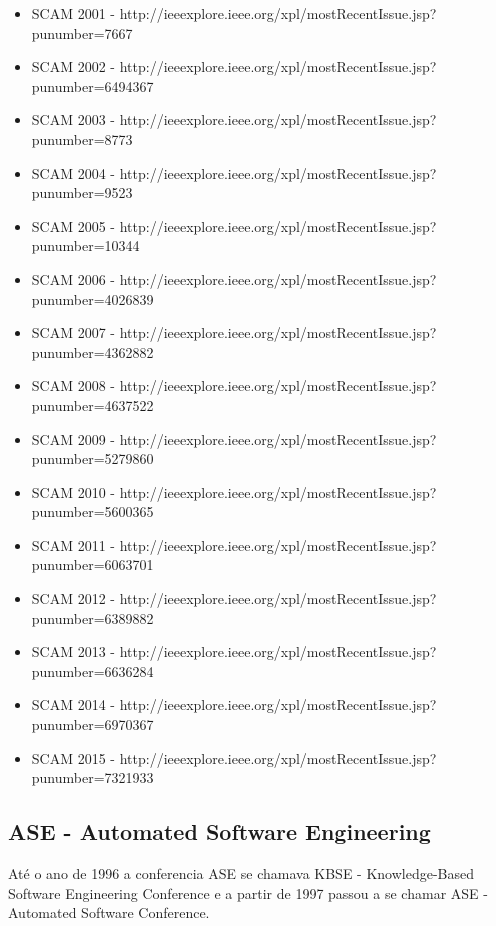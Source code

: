 \begin{itemize}
  \item SCAM 2001 - {\small http://ieeexplore.ieee.org/xpl/mostRecentIssue.jsp?punumber=7667}
  \item SCAM 2002 - {\small http://ieeexplore.ieee.org/xpl/mostRecentIssue.jsp?punumber=6494367}
  \item SCAM 2003 - {\small http://ieeexplore.ieee.org/xpl/mostRecentIssue.jsp?punumber=8773}
  \item SCAM 2004 - {\small http://ieeexplore.ieee.org/xpl/mostRecentIssue.jsp?punumber=9523}
  \item SCAM 2005 - {\small http://ieeexplore.ieee.org/xpl/mostRecentIssue.jsp?punumber=10344}
  \item SCAM 2006 - {\small http://ieeexplore.ieee.org/xpl/mostRecentIssue.jsp?punumber=4026839}
  \item SCAM 2007 - {\small http://ieeexplore.ieee.org/xpl/mostRecentIssue.jsp?punumber=4362882}
  \item SCAM 2008 - {\small http://ieeexplore.ieee.org/xpl/mostRecentIssue.jsp?punumber=4637522}
  \item SCAM 2009 - {\small http://ieeexplore.ieee.org/xpl/mostRecentIssue.jsp?punumber=5279860}
  \item SCAM 2010 - {\small http://ieeexplore.ieee.org/xpl/mostRecentIssue.jsp?punumber=5600365}
  \item SCAM 2011 - {\small http://ieeexplore.ieee.org/xpl/mostRecentIssue.jsp?punumber=6063701}
  \item SCAM 2012 - {\small http://ieeexplore.ieee.org/xpl/mostRecentIssue.jsp?punumber=6389882}
  \item SCAM 2013 - {\small http://ieeexplore.ieee.org/xpl/mostRecentIssue.jsp?punumber=6636284}
  \item SCAM 2014 - {\small http://ieeexplore.ieee.org/xpl/mostRecentIssue.jsp?punumber=6970367}
  \item SCAM 2015 - {\small http://ieeexplore.ieee.org/xpl/mostRecentIssue.jsp?punumber=7321933}
\end{itemize}

\subsection{ASE - Automated Software Engineering}

Até o ano de 1996 a conferencia ASE se chamava KBSE - Knowledge-Based Software
Engineering Conference e a partir de 1997 passou a se chamar ASE - Automated
Software Conference.

